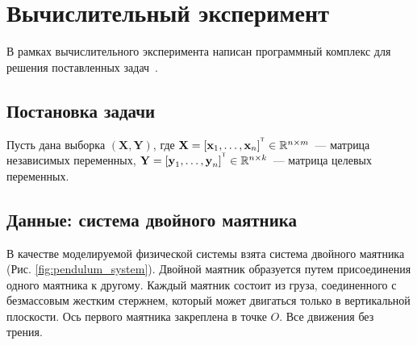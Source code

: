 \documentclass[12pt]{article}
\newcommand{\bY}{\mathbf{Y}}
\newcommand{\bX}{\mathbf{X}}
\newcommand{\T}{^{\text{\tiny\sffamily\upshape\mdseries T}}}
\begin{document}
	
	
	\section{Вычислительный эксперимент}
	В рамках вычислительного эксперимента написан программный комплекс для решения поставленных задач~\cite{source_code}.
	
	\subsection{Постановка задачи}
	
	Пусть дана выборка $(\bX, \bY)$, где $\textbf{X} = [\textbf{x}_1, \dots, \textbf{x}_{n}]^{\T} \in \mathbb{R}^{n \times m}$~--- матрица независимых переменных, $\textbf{Y} = [\textbf{y}_1, \dots, \textbf{y}_n]^{\T} \in \mathbb{R}^{n \times k}$~--- матрица целевых переменных.
	
	\subsection{Данные: система двойного маятника}
	
	В качестве моделируемой физической системы взята система двойного маятника (Рис. \ref{fig:pendulum_system}). Двойной маятник образуется путем присоединения одного маятника к другому. Каждый маятник состоит из груза, соединенного с безмассовым жестким стержнем, который может двигаться только в вертикальной плоскости. Ось первого маятника закреплена в точке $O$. Все движения без трения.
	
\end{document}
